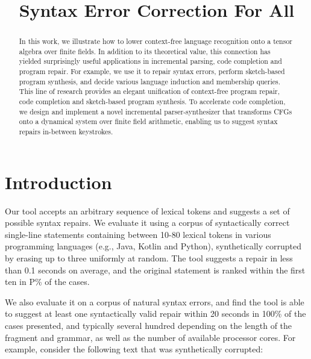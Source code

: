 \documentclass[sigplan,review,anonymous,acmsmall]{acmart}\settopmatter{printfolios=false,printccs=false,printacmref=false}
\begin{document}
\title{Syntax Error Correction For All}
\begin{abstract}
In this work, we illustrate how to lower context-free language recognition onto a tensor algebra over finite fields. In addition to its theoretical value, this connection has yielded surprisingly useful applications in incremental parsing, code completion and program repair. For example, we use it to repair syntax errors, perform sketch-based program synthesis, and decide various language induction and membership queries. This line of research provides an elegant unification of context-free program repair, code completion and sketch-based program synthesis. To accelerate code completion, we design and implement a novel incremental parser-synthesizer that transforms CFGs onto a dynamical system over finite field arithmetic, enabling us to suggest syntax repairs in-between keystrokes.
\end{abstract}

\maketitle

\section{Introduction}

  Our tool accepts an arbitrary sequence of lexical tokens and suggests a set of possible syntax repairs. We evaluate it using a corpus of syntactically correct single-line statements containing between 10-80 lexical tokens in various programming languages (e.g., Java, Kotlin and Python), synthetically corrupted by erasing up to three uniformly at random. The tool suggests a repair in less than 0.1 seconds on average, and the original statement is ranked within the first ten in P\% of the cases.

  We also evaluate it on a corpus of natural syntax errors, and find the tool is able to suggest at least one syntactically valid repair within 20 seconds in 100\% of the cases presented, and typically several hundred depending on the length of the fragment and grammar, as well as the number of available processor cores. For example, consider the following text that was synthetically corrupted:
\end{document}
